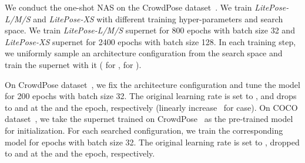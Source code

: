 \documentclass[10pt,twocolumn,letterpaper]{article}
\begin{document}
 We conduct the one-shot NAS on the CrowdPose dataset~\cite{li2019crowdpose}. 
We train \textit{LitePose-L/M/S} and \textit{LitePose-XS} with different training hyper-parameters and search space. We train \textit{LitePose-L/M/S} supernet for 800 epochs with batch size 32 and \textit{LitePose-XS} supernet for 2400 epochs with batch size 128. In each training step, we uniformly sample an architecture configuration from the search space and train the supernet with it ( for ,  for ).

 On CrowdPose dataset~\cite{li2019crowdpose}, we fix the architecture configuration and tune the model for 200 epochs with batch size 32. The original learning rate is set to , and drops to  and  at the  and the  epoch, respectively (linearly increase~\cite{he2019bag} for  case). On COCO dataset~\cite{lin2014microsoft}, we take the supernet trained on CrowdPose~\cite{li2019crowdpose} as the pre-trained model for initialization. For each searched configuration, we train the corresponding model for  epochs with batch size 32. The original learning rate is set to , dropped to  and  at the  and the  epoch, respectively.


\end{document}
